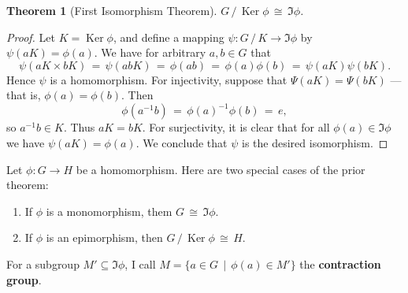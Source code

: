 \documentclass[11pt]{article}
\newtheorem{theorem}{Theorem}
\newcommand{\Ker}{\operatorname{Ker}}
\begin{document}
\begin{adjustwidth}{0.5cm}{}
  \begin{theorem}[First Isomorphism Theorem]
     $G \, / \, \Ker \phi \, \cong \, \Im \phi$.
  \end{theorem}
  \begin{proof}
    Let $K = \Ker \phi$, and define a mapping $\psi : G \, / \, K \to \Im \phi$ by $\psi(aK) = \phi(a)$. We have for arbitrary $a, b \in G$ that
    \[
      \psi(aK \times bK) \, = \, \psi(abK) \, = \, \phi(ab) \, = \, \phi(a) \phi(b) \, = \, \psi(aK) \psi(bK).
    \]
    Hence $\psi$ is a homomorphism. For injectivity, suppose that $\Psi(aK) = \Psi(bK)$ --- that is, $\phi(a) = \phi(b)$. Then
    \[
      \phi(a^{-1}b) \, = \, \phi(a)^{-1} \phi(b) \, = \, e,
    \]
    so $a^{-1}b \in K$. Thus $aK = bK$. For surjectivity, it is clear that for all $\phi(a) \in \Im \phi$ we have $\psi(aK) = \phi(a)$. We conclude that $\psi$ is the desired isomorphism.
  \end{proof}
\end{adjustwidth}

\newpage

Let $\phi : G \to H$ be a homomorphism. Here are two special cases of the prior theorem:
\begin{enumerate}
  \item If $\phi$ is a monomorphism, them $G \, \cong \, \Im \phi$.
  \item If $\phi$ is an epimorphism, then $G \, / \, \Ker \phi \, \cong \, H$.
\end{enumerate}

For a subgroup $M' \subseteq \Im \phi$, I call $M = \{ a \in G \, \mid \, \phi(a) \in M' \}$ the \textbf{contraction group}.
\end{document}

